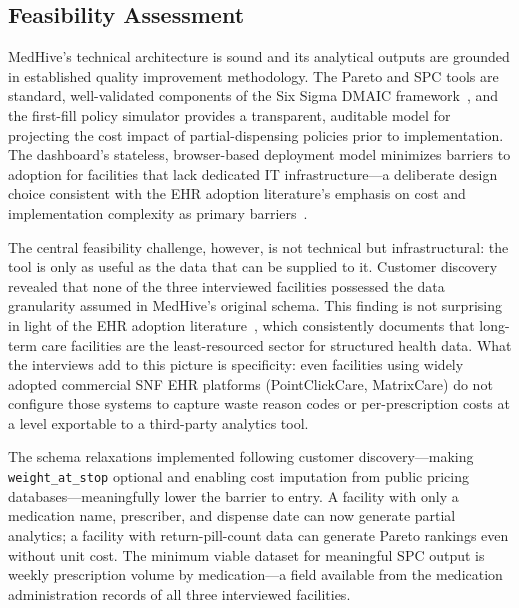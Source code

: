 \documentclass[letterpaper, 10pt, conference]{IEEEconf}
\begin{document}
\subsection{Feasibility Assessment}

MedHive's technical architecture is sound and its analytical outputs are
grounded in established quality improvement methodology.
The Pareto and SPC tools are standard, well-validated components of the Six
Sigma DMAIC framework~\cite{Benneyan2003Statistical, Thor2007Application,
Sallam2024Enhancing}, and the first-fill policy simulator provides a
transparent, auditable model for projecting the cost impact of partial-dispensing
policies prior to implementation.
The dashboard's stateless, browser-based deployment model minimizes barriers
to adoption for facilities that lack dedicated IT infrastructure---a deliberate
design choice consistent with the EHR adoption literature's emphasis on cost
and implementation complexity as primary
barriers~\cite{Kruse2016Barriers,Tsai2020Effects}.

The central feasibility challenge, however, is not technical but
infrastructural: the tool is only as useful as the data that can be supplied
to it.
Customer discovery revealed that none of the three interviewed facilities
possessed the data granularity assumed in MedHive's original schema.
This finding is not surprising in light of the EHR adoption
literature~\cite{Kruse2015Adoption, Vest2019Adoption, Felix2020Organizational},
which consistently documents that long-term care facilities are the
least-resourced sector for structured health data.
What the interviews add to this picture is specificity: even facilities using
widely adopted commercial SNF EHR platforms (PointClickCare, MatrixCare) do
not configure those systems to capture waste reason codes or per-prescription
costs at a level exportable to a third-party analytics tool.

The schema relaxations implemented following customer discovery---making
\texttt{weight\_at\_stop} optional and enabling cost imputation from
public pricing databases---meaningfully lower the barrier to entry.
A facility with only a medication name, prescriber, and dispense date can now
generate partial analytics; a facility with return-pill-count data can generate
Pareto rankings even without unit cost.
The minimum viable dataset for meaningful SPC output is weekly prescription
volume by medication---a field available from the medication administration
records of all three interviewed facilities.
\end{document}
